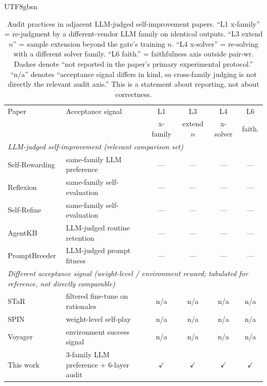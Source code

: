 \documentclass{article}
\begin{document}
\begin{CJK*}{UTF8}{gbsn}
\begin{table}[h]
  \centering\small
  \setlength{\tabcolsep}{4pt}
  \begin{tabular}{l l c c c c}
    \toprule
    Paper & Acceptance signal & L1 & L3 & L4 & L6 \\
                 &  & x-family & extend \(n\) & x-solver & faith. \\
    \midrule
    \multicolumn{6}{l}{\emph{LLM-judged self-improvement (relevant comparison set)}}\\
    Self-Rewarding \citep{yuan2024selfrewarding} & same-family LLM preference     & --- & --- & --- & --- \\
    Reflexion \citep{shinn2023reflexion}     & same-family self-evaluation        & --- & --- & --- & --- \\
    Self-Refine \citep{madaan2023selfrefine} & same-family self-evaluation        & --- & --- & --- & --- \\
    AgentKB \citep{sumers2024agentkb}        & LLM-judged routine retention       & --- & --- & --- & --- \\
    PromptBreeder \citep{fernando2023promptbreeder} & LLM-judged prompt fitness   & --- & --- & --- & --- \\
    \midrule
    \multicolumn{6}{l}{\emph{Different acceptance signal (weight-level / environment reward; tabulated for reference, not directly comparable)}}\\
    STaR \citep{zelikman2022star}            & filtered fine-tune on rationales   & n/a & n/a & n/a & n/a \\
    SPIN \citep{chen2024selfplay}            & weight-level self-play               & n/a & n/a & n/a & n/a \\
    Voyager \citep{wang2023voyager}          & environment success signal           & n/a & n/a & n/a & n/a \\
    \midrule
    This work                                & 3-family LLM preference + 6-layer audit & \(\checkmark\) & \(\checkmark\) & \(\checkmark\) & \(\checkmark\) \\
    \bottomrule
  \end{tabular}
  \caption{Audit practices in adjacent LLM-judged self-improvement
    papers. ``L1 x-family'' = re-judgment by a different-vendor LLM
    family on identical outputs. ``L3 extend \(n\)'' = sample
    extension beyond the gate's training \(n\). ``L4 x-solver'' =
    re-solving with a different solver family. ``L6 faith.'' =
    faithfulness axis outside pair-wr. Dashes denote ``not
    reported in the paper's primary experimental protocol.''
    ``n/a'' denotes ``acceptance signal differs in kind, so
    cross-family judging is not directly the relevant audit axis.''
    This is a statement about reporting, not about correctness.}
  \label{tab:audit-practices}
\end{table}


\end{CJK*}
\end{document}
